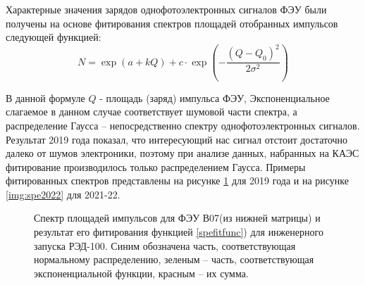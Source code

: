 Характерные значения зарядов однофотоэлектронных сигналов ФЭУ были получены на основе фитирования спектров площадей отобранных импульсов следующей функцией:
\begin{equation}
N=\exp (a+k Q)+c \cdot \exp \left(-\frac{\left(Q-Q_0\right)^2}{2 \sigma^2}\right)
\label{spefitfunc}
\end{equation}
\par В данной формуле $Q$ - площадь (заряд) импульса ФЭУ,  Экспоненциальное слагаемое в данном случае соответствует шумовой части спектра, а распределение Гаусса -- непосредственно спектру однофотоэлектронных сигналов. Результат 2019 года показал, что интересующий нас сигнал отстоит достаточно далеко от шумов электроники, поэтому при анализе данных, набранных на КАЭС фитирование производилось только распределением Гаусса. Примеры фитированных спектров представлены на рисунке \ref{img:spe2019} для 2019 года и на рисунке \ref{img:spe2022} для 2021-22. 

\begin{figure}[H]
	\caption[Спектр площадей импульсов для ФЭУ В07(из нижней матрицы) и результат его фитирования функцией \ref{spefitfunc}) для инженерного запуска РЭД-100.] {Спектр площадей импульсов для ФЭУ В07(из нижней матрицы) и результат его фитирования функцией \ref{spefitfunc}) для инженерного запуска РЭД-100. Синим обозначена часть, соответствующая нормальному распределению, зеленым -- часть, соответствующая экспоненциальной функции, красным -- их сумма.}
	\label{img:spe2019}
\end{figure}

